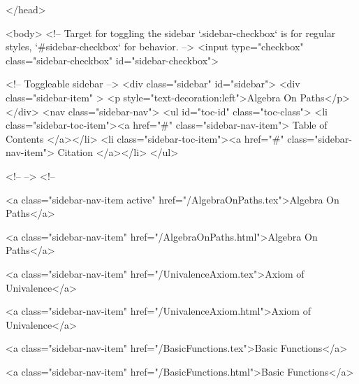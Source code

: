   
</head>




  <body>
    <!-- Target for toggling the sidebar `.sidebar-checkbox` is for regular
     styles, `#sidebar-checkbox` for behavior. -->
<input type="checkbox" class="sidebar-checkbox" id="sidebar-checkbox">

<!-- Toggleable sidebar -->
<div class="sidebar" id="sidebar">
  <div class="sidebar-item" >
    <p style="text-decoration:left">Algebra On Paths</p>
  </div>
  <nav class="sidebar-nav">
    <ul id="toc-id" class="toc-class">
  <li class="sidebar-toc-item"><a href="#" class="sidebar-nav-item"> Table of Contents </a></li>
  <li class="sidebar-toc-item"><a href="#" class="sidebar-nav-item"> Citation </a></li>
</ul>


    <!--  -->
    <!-- 
      
    
      
    
      
    
      
        
      
    
      
        
          <a class="sidebar-nav-item active" href="/AlgebraOnPaths.tex">Algebra On Paths</a>
        
      
    
      
        
          <a class="sidebar-nav-item" href="/AlgebraOnPaths.html">Algebra On Paths</a>
        
      
    
      
        
          <a class="sidebar-nav-item" href="/UnivalenceAxiom.tex">Axiom of Univalence</a>
        
      
    
      
        
          <a class="sidebar-nav-item" href="/UnivalenceAxiom.html">Axiom of Univalence</a>
        
      
    
      
        
          <a class="sidebar-nav-item" href="/BasicFunctions.tex">Basic Functions</a>
        
      
    
      
        
          <a class="sidebar-nav-item" href="/BasicFunctions.html">Basic Functions</a>
        
      
    
      
        
